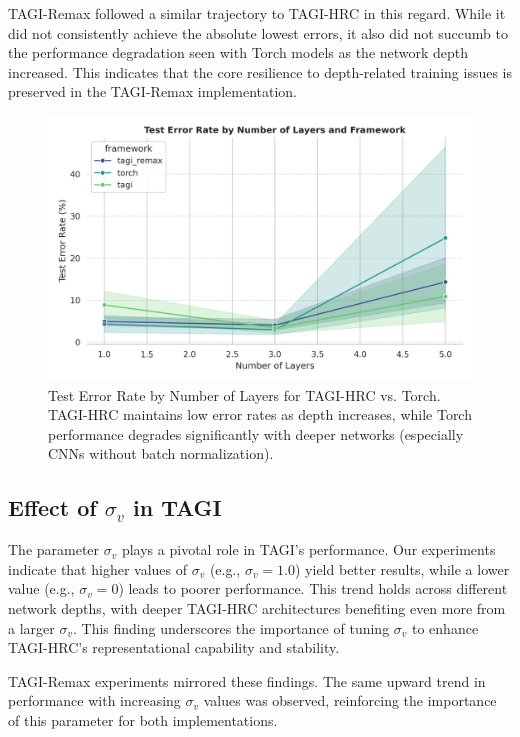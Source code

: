 \documentclass{article}
\begin{document}
TAGI-Remax followed a similar trajectory to TAGI-HRC in this regard. While it did not consistently achieve the absolute lowest errors, it also did not succumb to the performance degradation seen with Torch models as the network depth increased. This indicates that the core resilience to depth-related training issues is preserved in the TAGI-Remax implementation.

\begin{figure}[h]
\centering
\includegraphics[width=1.0\linewidth]{Figures/num_layers_test_error.png}
\caption{Test Error Rate by Number of Layers for TAGI-HRC vs. Torch. TAGI-HRC maintains low error rates as depth increases, while Torch performance degrades significantly with deeper networks (especially CNNs without batch normalization).}
\label{fig:num_layers_comparison}
\end{figure}

\subsection{Effect of \texorpdfstring{$\sigma_v$}{sigma\_v} in TAGI}
The parameter $\sigma_v$ plays a pivotal role in TAGI’s performance. Our experiments indicate that higher values of $\sigma_v$ (e.g., $\sigma_v = 1.0$) yield better results, while a lower value (e.g., $\sigma_v = 0$) leads to poorer performance. This trend holds across different network depths, with deeper TAGI-HRC architectures benefiting even more from a larger $\sigma_v$. This finding underscores the importance of tuning $\sigma_v$ to enhance TAGI-HRC's representational capability and stability.

TAGI-Remax experiments mirrored these findings. The same upward trend in performance with increasing $\sigma_v$ values was observed, reinforcing the importance of this parameter for both implementations.
\end{document}
